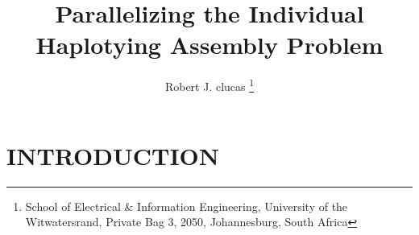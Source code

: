 \documentclass[10pt,twocolumn]{witseiepaper}
\begin{document}
\title{ Parallelizing the Individual Haplotying Assembly Problem }

\author{Robert J. clucas
\thanks{School of Electrical \& Information Engineering, University of the
Witwatersrand, Private Bag 3, 2050, Johannesburg, South Africa}
}


\abstract{}


\maketitle
\thispagestyle{empty}\pagestyle{empty}



\section{INTRODUCTION}
\end{document}
